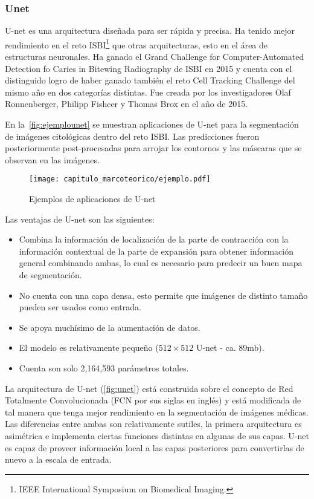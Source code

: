 \subsubsection{Unet}

U-net es una arquitectura diseñada para ser rápida y precisa. Ha tenido mejor
rendimiento en el reto ISBI\footnote{IEEE International Symposium on Biomedical
Imaging.} que otras arquitecturas, esto en el área de estructuras neuronales. Ha
ganado el Grand Challenge for Computer-Automated Detection fo Caries in Bitewing
Radiography de ISBI en 2015 y cuenta con el distinguido logro de haber ganado
también el reto Cell Tracking Challenge del mismo año en dos categorías
distintas. Fue creada por los investigadores Olaf Ronnenberger, Philipp Fishcer
y Thomas Brox en el año de 2015.~\cite{Ronneberger2015}

En la~\autoref{fig:ejemplounet} se muestran aplicaciones de U-net para la
segmentación de imágenes citológicas dentro del reto ISBI. Las predicciones
fueron posteriormente post-procesadas para arrojar los contornos y las máscaras
que se observan en las imágenes.

\begin{figure}[H]
    \centering
    \texttt{[image: capitulo\_marcoteorico/ejemplo.pdf]}
    \caption{Ejemplos de aplicaciones de U-net}\label{fig:ejemplounet}
\end{figure}

Las ventajas de U-net son las siguientes:

\begin{itemize}
    \item Combina la información de localización de la parte de contracción con la
    información contextual de la parte de expansión para obtener información
    general combinando ambas, lo cual es necesario para predecir un buen mapa
    de segmentación.
    \item No cuenta con una capa densa, esto permite que imágenes de distinto
    tamaño pueden ser usados como entrada.
    \item Se apoya muchísimo de la aumentación de datos.
    \item El modelo es relativamente pequeño (\(512\times512\) U-net - ca. 89mb).
    \item Cuenta son solo 2,164,593 parámetros totales.
\end{itemize}

La arquitectura de U-net (\autoref{fig:unet}) está construida sobre el concepto de 
Red Totalmente Convolucionada (FCN por sus siglas en inglés) y está modificada
de tal manera que tenga mejor rendimiento en la segmentación de imágenes médicas. 
Las diferencias entre ambas son relativamente sutiles, la primera arquitectura es
asimétrica e implementa ciertas funciones distintas en algunas de sus capas. U-net
es capaz de proveer información local a las capas posteriores para convertirlas
de nuevo a la escala de entrada.~\cite{DeepLearning}

